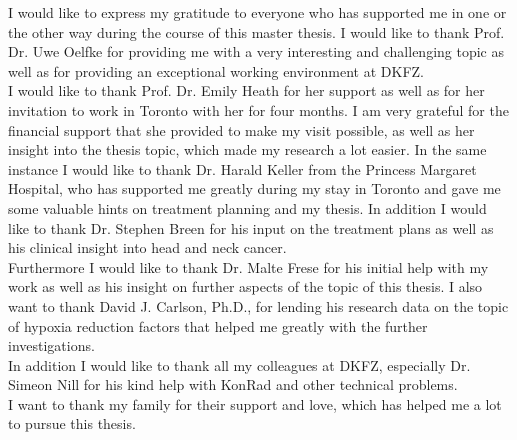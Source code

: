 %
I would like to express my gratitude to everyone who has supported me in one or the other way during the course of this master thesis. I would like to thank Prof. Dr. Uwe Oelfke for providing me with a very interesting and challenging topic as well as for providing an exceptional working environment at DKFZ.\\I would like to thank Prof. Dr. Emily Heath for her support as well as for her invitation to work in Toronto with her for four months. I am very grateful for the financial support that she provided to make my visit possible, as well as her insight into the thesis topic, which made my research a lot easier. In the same instance I would like to thank Dr. Harald Keller from the Princess Margaret Hospital, who has supported me greatly during my stay in Toronto and gave me some valuable hints on treatment planning and my thesis. In addition I would like to thank Dr. Stephen Breen for his input on the treatment plans as well as his clinical insight into head and neck cancer.\\Furthermore I would like to thank Dr. Malte Frese for his initial help with my work as well as his insight on further aspects of the topic of this thesis. I also want to thank David J. Carlson, Ph.D., for lending his research data on the topic of hypoxia reduction factors that helped me greatly with the further investigations.\\In addition I would like to thank all my colleagues at DKFZ, especially Dr. Simeon Nill for his kind help with KonRad and other technical problems.\\I want to thank my family for their support and love, which has helped me a lot to pursue this thesis.